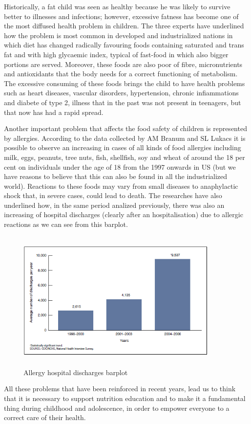 Historically, a fat child was seen as healthy because he was likely to survive better to illnesses and infections; however, excessive fatness has become one of the most diffused health problem in children. The three experts have underlined how the problem is most common in developed and industrialized nations in which diet has changed radically favouring foods containing saturated and trans fat and with high glycaemic index, typical of fast-food in which also bigger portions are served. Moreover, these foods are also poor of fibre, micronutrients and antioxidants that the body needs for a correct functioning of metabolism. The excessive consuming of these foods brings the child to have health problems such as heart diseases, vascular disorders, hypertension, chronic infiammations and diabete of type 2, illness that in the past was not present in teenagers, but that now has had a rapid spread.\linebreak 

Another important problem that affects the food safety of children is represented by allergies.
According to the data collected by AM Branum and SL Lukacs \cite{FoodallergyUSchildren} it is possible to observe an increasing in cases of all kinds of food allergies including milk, eggs, peanuts, tree nuts, fish, shellfish, soy and wheat of around the 18 per cent on individuals under the age of 18 from the 1997 onwards in US (but we have reasons to believe that this can also be found in all the industrialized world). Reactions to these foods may vary from small diseases to anaphylactic shock that, in severe cases, could lead to death.
The researches have also underlined how, in the same period analized previously, there was also an increasing of hospital discharges (clearly after an hospitalisation) due to allergic reactions as we can see from this barplot.
\begin{figure}[H]
\centering
\includegraphics[width=10cm, height=7cm]{immagini/allergybarplot.png}
\caption{Allergy hospital discharges barplot}\label{fig:allergybarplot}
\end{figure}
All these problems that have been reinforced in recent years, lead us to think that it is necessary to support nutrition education and to make it a fundamental thing during childhood and adolescence, in order to empower everyone to a correct care of their health.

